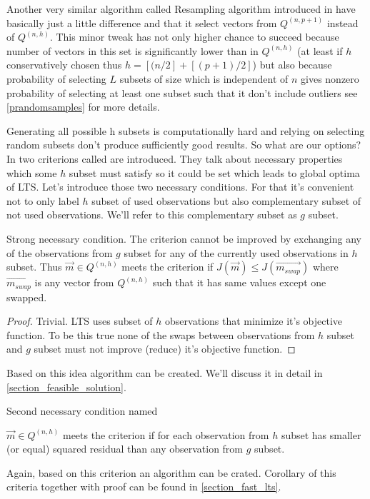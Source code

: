 Another very similar algorithm called Resampling algorithm introduced in \cite{rousseeuw1987robust}
have basically just a little difference and that it select vectors from $Q^{(n,p+1)}$ instead of 
$Q^{(n, h)}$. This minor tweak has not only higher chance to succeed because number of vectors in this set is significantly lower than in $Q^{(n, h)}$ (at least if $h$ conservatively chosen thus $h = [(n/2] + [(p+1)/2]$) but also because probability of selecting $L$ subsets of size which is independent of $n$ gives nonzero probability of selecting at least one subset such that it don't include outliers see \ref{prandomsamples} for more details.

Generating all possible h subsets is computationally hard and relying on selecting random subsets don't produce sufficiently good results. So what are our options? In \cite{hawkins1999improved} two criterions called  are introduced. They talk about necessary properties which some $h$ subset must satisfy so it could be set which leads to global optima of LTS. Let's introduce those two necessary conditions. For that it's convenient not to only label $h$ subset of used observations but also complementary subset of not used observations. We'll refer to this complementary subset as $g$ subset.

\begin{theorem} \label{strong_condition}Strong necessary condition.
The criterion cannot be improved by exchanging any of the observations from $g$ subset 
for any of the currently used observations in $h$ subset. Thus $\vec{m} \in Q^{(n, h)}$ meets the criterion if  $J(\vec{m}) \leq J(\vec{m_{swap}})$ where $\vec{m_{swap}}$ is any vector from $Q^{(n, h)}$ such that it has same values except one swapped.
\end{theorem}

\begin{proof}
	Trivial. LTS uses subset of $h$ observations that minimize it's objective function. To be this true none of the swaps between observations from $h$ subset and $g$ subset  must not improve (reduce) it's objective function. 
\end{proof}
Based on this idea algorithm can be created. We'll discuss it in detail in \ref{section_feasible_solution}.

Second necessary condition named  
\begin{theorem}
	$\vec{m} \in Q^{(n, h)}$ meets the criterion if for each observation from $h$ subset has smaller (or equal) squared residual than any observation from $g$ subset.
\end{theorem}	
Again, based on this criterion an algorithm can be crated. Corollary of this criteria together with proof can be found in \ref{section_fast_lts}. 

